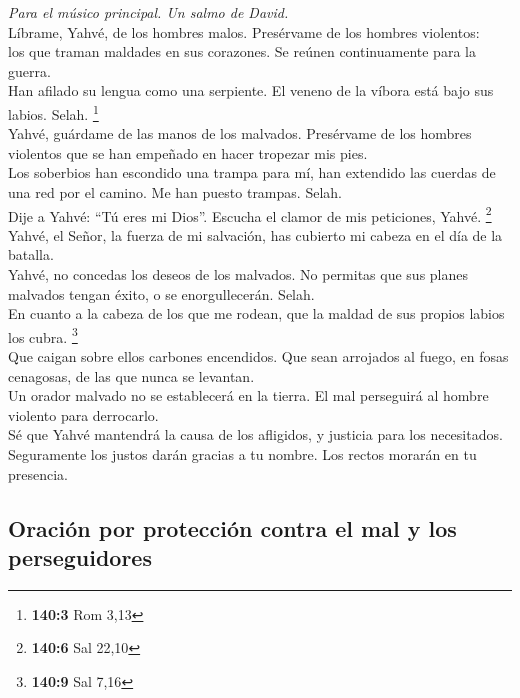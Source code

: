 \emph{Para el músico principal. Un salmo de David.}\\
 Líbrame, Yahvé, de los hombres malos. Presérvame de los
hombres violentos:\\
 los que traman maldades en sus corazones. Se reúnen
continuamente para la guerra.\\
 Han afilado su lengua como una serpiente. El veneno de la
víbora está bajo sus labios. Selah. \footnote{\textbf{140:3} Rom 3,13}\\
 Yahvé, guárdame de las manos de los malvados. Presérvame
de los hombres violentos que se han empeñado en hacer tropezar mis
pies.\\
 Los soberbios han escondido una trampa para mí, han
extendido las cuerdas de una red por el camino. Me han puesto trampas.
Selah.\\
 Dije a Yahvé: ``Tú eres mi Dios''. Escucha el clamor de
mis peticiones, Yahvé. \footnote{\textbf{140:6} Sal 22,10}\\
 Yahvé, el Señor, la fuerza de mi salvación, has cubierto
mi cabeza en el día de la batalla.\\
 Yahvé, no concedas los deseos de los malvados. No
permitas que sus planes malvados tengan éxito, o se enorgullecerán.
Selah.\\
 En cuanto a la cabeza de los que me rodean, que la maldad
de sus propios labios los cubra. \footnote{\textbf{140:9} Sal 7,16}\\
 Que caigan sobre ellos carbones encendidos. Que sean
arrojados al fuego, en fosas cenagosas, de las que nunca se levantan.\\
 Un orador malvado no se establecerá en la tierra. El mal
perseguirá al hombre violento para derrocarlo.\\
 Sé que Yahvé mantendrá la causa de los afligidos, y
justicia para los necesitados.\\
 Seguramente los justos darán gracias a tu nombre. Los
rectos morarán en tu presencia.

\hypertarget{oraciuxf3n-por-protecciuxf3n-contra-el-mal-y-los-perseguidores}{%
\subsection{Oración por protección contra el mal y los
perseguidores}\label{oraciuxf3n-por-protecciuxf3n-contra-el-mal-y-los-perseguidores}}

